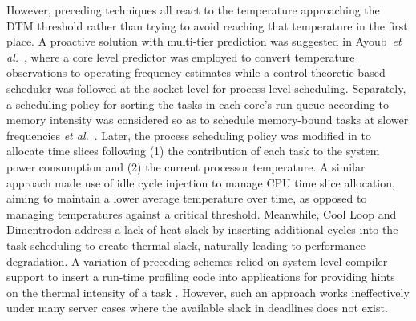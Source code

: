 \documentclass[times, 10pt,twocolumn]{IEEEtran}
\begin{document}
However, preceding techniques all react to the temperature approaching the
DTM threshold rather than trying to avoid reaching that temperature in
the first place.  A proactive solution with multi-tier prediction was suggested in
Ayoub~\textit{et al.}\ \cite{Ayoub2011}, where a
core level predictor was employed to convert temperature observations to operating frequency estimates
while a control-theoretic based scheduler was followed at the socket level for process level scheduling.
Separately, a scheduling policy for sorting the tasks in each core's run queue according to
memory intensity was considered  so as to schedule memory-bound tasks at slower frequencies
\textit{et al.}\ \cite{Merkel2008b,Merkel2010}.  
Later, the process scheduling policy was modified in \cite{Bellosa2003} to allocate time slices
following (1) the contribution of each task to the system power consumption and
(2) the current processor temperature.  
A similar approach made use of idle cycle injection to manage CPU time slice allocation,
aiming to maintain a lower average temperature over time,
as opposed to managing temperatures against a critical threshold.
Meanwhile, Cool Loop \cite{Choi2007} and Dimentrodon \cite{Bailis2011} address a lack of heat slack
by inserting additional cycles into the task scheduling to create
thermal slack, naturally leading to performance degradation.
A variation of preceding schemes relied on system level compiler support to
insert a run-time profiling code into applications 
for providing hints on the thermal intensity of a task \cite{LiK2008}.  
However, such an approach works ineffectively under many server
cases where the available slack in deadlines does not exist.
\end{document}
